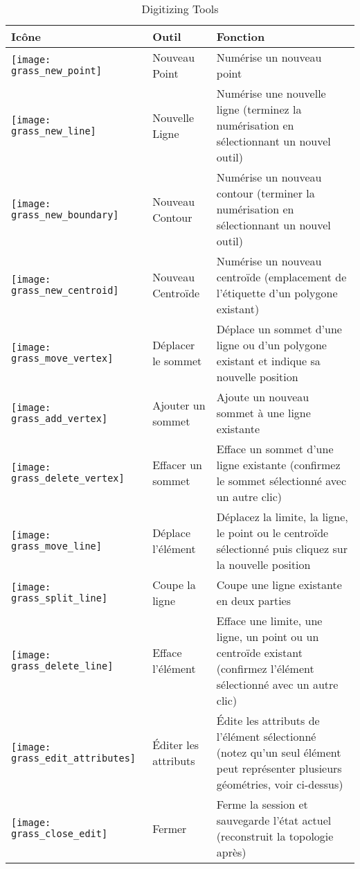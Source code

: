 {\begin{table}[p]
\begin{tabular}{|m{1cm}|m{4cm}|m{8.5cm}|}
\hline \textbf{Icône} & \textbf{Outil} & \textbf{Fonction} \\
\hline \texttt{[image: grass\_new\_point]} & Nouveau Point & Numérise un nouveau point \\
\hline \texttt{[image: grass\_new\_line]} & Nouvelle Ligne & Numérise une nouvelle ligne (terminez la numérisation en sélectionnant un nouvel outil) \\
\hline \texttt{[image: grass\_new\_boundary]} & Nouveau Contour & Numérise un nouveau contour (terminer la numérisation en sélectionnant un nouvel outil)\\
\hline \texttt{[image: grass\_new\_centroid]} & Nouveau Centroïde & Numérise un nouveau centroïde (emplacement de l'étiquette d'un polygone existant)\\
\hline \texttt{[image: grass\_move\_vertex]} & Déplacer le sommet & Déplace un sommet d'une ligne ou d'un polygone existant et indique sa nouvelle position\\
\hline \texttt{[image: grass\_add\_vertex]} & Ajouter un sommet & Ajoute un nouveau sommet à une ligne existante\\
\hline \texttt{[image: grass\_delete\_vertex]} & Effacer un sommet & Efface un sommet d'une ligne existante (confirmez le sommet sélectionné avec un autre clic)\\
\hline \texttt{[image: grass\_move\_line]} & Déplace l'élément & Déplacez la limite, la ligne, le point ou le centroïde sélectionné puis cliquez sur la nouvelle position\\
\hline \texttt{[image: grass\_split\_line]} & Coupe la ligne & Coupe une ligne existante en deux parties\\
\hline \texttt{[image: grass\_delete\_line]} & Efface l'élément & Efface une limite, une ligne, un point ou un centroïde existant (confirmez l'élément sélectionné avec un autre clic)\\
\hline \texttt{[image: grass\_edit\_attributes]} & Éditer les attributs & Édite les attributs de l'élément sélectionné (notez qu'un seul élément peut représenter plusieurs géométries, voir ci-dessus)\\
\hline \texttt{[image: grass\_close\_edit]} & Fermer & Ferme la session et sauvegarde l'état actuel (reconstruit la topologie après)\\
\hline
\end{tabular}
\caption{\grass Digitizing Tools}\label{tab:grass_tools}
\end{table}}

